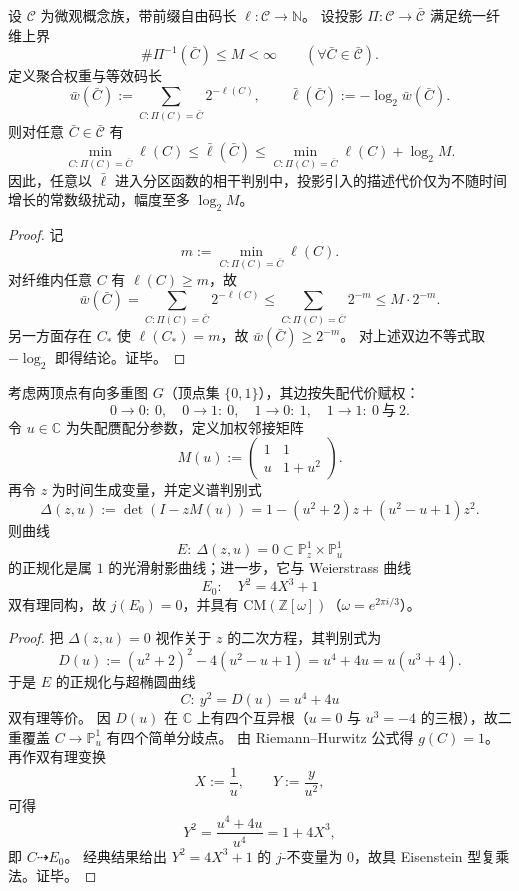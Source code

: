 \begin{proposition}[有限多对一投影下的全息聚合界]\label{prop:xi-finite-to-one-holographic-aggregation-bound}
设 \(\mathcal C\) 为微观概念族，带前缀自由码长 \(\ell:\mathcal C\to\mathbb N\)。
设投影 \(\Pi:\mathcal C\to\bar{\mathcal C}\) 满足统一纤维上界
\[
\#\Pi^{-1}(\bar C)\le M<\infty\qquad(\forall \bar C\in\bar{\mathcal C}).
\]
定义聚合权重与等效码长
\[
\bar w(\bar C):=\sum_{C:\Pi(C)=\bar C}2^{-\ell(C)},
\qquad
\bar\ell(\bar C):=-\log_2\bar w(\bar C).
\]
则对任意 \(\bar C\in\bar{\mathcal C}\) 有
\[
\min_{C:\Pi(C)=\bar C}\ell(C)
\le
\bar\ell(\bar C)
\le
\min_{C:\Pi(C)=\bar C}\ell(C)+\log_2 M.
\]
因此，任意以 \(\bar\ell\) 进入分区函数的相干判别中，投影引入的描述代价仅为不随时间增长的常数级扰动，幅度至多 \(\log_2 M\)。
\end{proposition}

\begin{proof}
记
\[
m:=\min_{C:\Pi(C)=\bar C}\ell(C).
\]
对纤维内任意 \(C\) 有 \(\ell(C)\ge m\)，故
\[
\bar w(\bar C)
=
\sum_{C:\Pi(C)=\bar C}2^{-\ell(C)}
\le
\sum_{C:\Pi(C)=\bar C}2^{-m}
\le
M\cdot 2^{-m}.
\]
另一方面存在 \(C_\ast\) 使 \(\ell(C_\ast)=m\)，故 \(\bar w(\bar C)\ge 2^{-m}\)。
对上述双边不等式取 \(-\log_2\) 即得结论。证毕。
\end{proof}

\begin{theorem}[最小相干传输子的谱曲线与 \(j=0\) 的 CM 椭圆曲线]\label{thm:xi-minimal-coherence-propagator-cm-j0}
考虑两顶点有向多重图 \(G\)（顶点集 \(\{0,1\}\)），其边按失配代价赋权：
\[
0\to 0:\ 0,\quad
0\to 1:\ 0,\quad
1\to 0:\ 1,\quad
1\to 1:\ 0\ \text{与}\ 2.
\]
令 \(u\in\mathbb C\) 为失配赝配分参数，定义加权邻接矩阵
\[
M(u):=
\begin{pmatrix}
1 & 1\\
u & 1+u^2
\end{pmatrix}.
\]
再令 \(z\) 为时间生成变量，并定义谱判别式
\[
\Delta(z,u):=\det(I-zM(u))
=1-(u^2+2)z+(u^2-u+1)z^2.
\]
则曲线
\[
E:\ \Delta(z,u)=0\subset \mathbb P^1_z\times\mathbb P^1_u
\]
的正规化是属 \(1\) 的光滑射影曲线；进一步，它与 Weierstrass 曲线
\[
E_0:\quad Y^2=4X^3+1
\]
双有理同构，故 \(j(E_0)=0\)，并具有 \(\mathrm{CM}(\mathbb Z[\omega])\)（\(\omega=e^{2\pi i/3}\)）。
\end{theorem}

\begin{proof}
把 \(\Delta(z,u)=0\) 视作关于 \(z\) 的二次方程，其判别式为
\[
D(u):=(u^2+2)^2-4(u^2-u+1)=u^4+4u=u(u^3+4).
\]
于是 \(E\) 的正规化与超椭圆曲线
\[
C:\ y^2=D(u)=u^4+4u
\]
双有理等价。
因 \(D(u)\) 在 \(\mathbb C\) 上有四个互异根（\(u=0\) 与 \(u^3=-4\) 的三根），故二重覆盖 \(C\to\mathbb P^1_u\) 有四个简单分歧点。
由 Riemann--Hurwitz 公式得 \(g(C)=1\)。
再作双有理变换
\[
X:=\frac{1}{u},
\qquad
Y:=\frac{y}{u^2},
\]
可得
\[
Y^2
=
\frac{u^4+4u}{u^4}
=
1+4X^3,
\]
即 \(C\dashrightarrow E_0\)。
经典结果给出 \(Y^2=4X^3+1\) 的 \(j\)-不变量为 \(0\)，故具 Eisenstein 型复乘法。证毕。
\end{proof}

